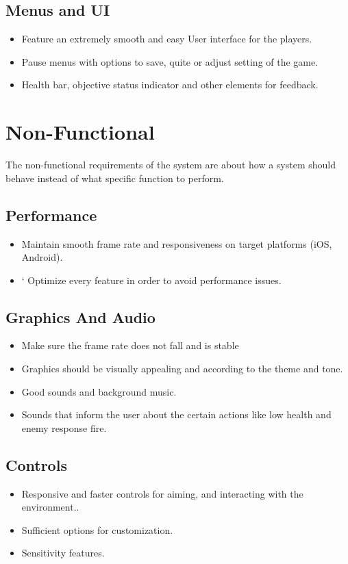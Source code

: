 \subsection{Menus and UI}
\begin{itemize}
	\item	Feature an extremely smooth and easy User interface for the players.
	\item 	Pause menus with options to save, quite or adjust setting of the game.
	\item 	Health bar, objective status indicator and other elements for feedback.
\end{itemize}

\section{Non-Functional}
The non-functional requirements of the system are about how a system should behave instead of what specific function to perform.
\subsection{Performance}
\begin{itemize}
	\item 	Maintain smooth frame rate and responsiveness on target platforms (iOS, Android).
	\item`	Optimize every feature in order to avoid performance issues.
\end{itemize}
\subsection{Graphics And Audio}
\begin{itemize}
	\item   Make sure the frame rate does not fall and is stable \cite {singh2023effect}
	\item 	Graphics should be visually appealing and according to the theme and tone.
	\item 	Good sounds and background music.
	\item 	Sounds that inform the user about the certain actions like low health and enemy response fire.
\end{itemize}
\subsection{Controls}
\begin{itemize}
	\item 	Responsive and faster controls for aiming, and interacting with the environment..
	\item 	Sufficient options for customization.
	\item 	Sensitivity features.
\end{itemize}
